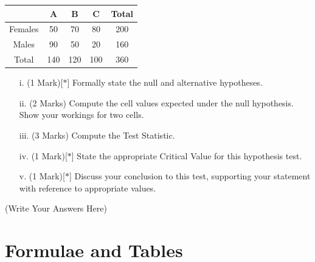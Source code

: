 \documentclass[a4paper,12pt]{article}
\begin{document}
{
	\large
\begin{center}
\begin{tabular}{|c|c|c|c|c|}
\hline
& A & B & C &  Total\\ \hline
Females & 50 & 70 & 80 & 200 \\ \hline
Males   & 90 & 50 & 20 &  160\\ \hline
Total & 140 & 120 & 100 & 360\\ \hline
\end{tabular} 
\end{center}
}
\begin{itemize}
	\item[i.](1 Mark)[$\ast$] Formally state the null and alternative hypotheses.
	\item[ii.] (2 Marks) Compute the cell values expected under the null hypothesis. Show your workings for two cells.
	\item[iii.](3 Marks) Compute the Test Statistic.
	\item[iv.](1 Mark)[$\ast$] State the appropriate Critical Value for this hypothesis test.
	\item[v.](1 Mark)[$\ast$] Discuss your conclusion to this test, supporting your statement with reference to appropriate values.
\end{itemize}
\newpage
(Write Your Answers Here)
%

\newpage


\section*{Formulae and Tables}
\end{document}
